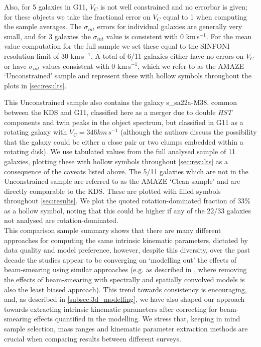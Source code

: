 \documentclass[fleqn,usenatbib]{mnras}
\begin{document}
Also, for 5 galaxies in G11, $V_{C}$ is not well constrained and no errorbar is given; for these objects we take the fractional error on $V_{C}$ equal to 1 when computing the sample averages.
The $\sigma_{int}$ errors for individual galaxies are generally very small, and for 3 galaxies the $\sigma_{int}$ value is consistent with 0 km\,s$^{-1}$.
For the mean value computation for the full sample we set these equal to the SINFONI resolution limit of 30 km\,s$^{-1}$.
A total of 6/11 galaxies either have no errors on $V_{C}$ or have $\sigma_{int}$ values consistent with 0 km\,s$^{-1}$, which we refer to as the AMAZE `Unconstrained' sample and represent these with hollow symbols throughout the plots in \cref{sec:results}.


This Unconstrained sample also contains the galaxy s\_sa22a-M38, common between the KDS and G11, classified here as a merger due to double {\em HST} components and twin peaks in the object spectrum, but classified in G11 as a rotating galaxy with $V_{C} = 346 km\,s^{-1}$ (although the authors discuss the possibility that the galaxy could be either a close pair or two clumps embedded within a rotating disk).
We use tabulated values from the full analysed sample of 11 galaxies, plotting these with hollow symbols throughout \cref{sec:results} as a consequence of the caveats listed above.
The 5/11 galaxies which are not in the Unconstrained sample are referred to as the AMAZE `Clean sample' and are directly comparable to the KDS.
These are plotted with filled symbols throughout \cref{sec:results}.
We plot the quoted rotation-dominated fraction of 33$\%$ as a hollow symbol, noting that this could be higher if any of the 22/33 galaxies not analysed are rotation-dominated. \\


This comparison sample summary shows that there are many different approaches for computing the same intrinsic kinematic parameters, dictated by data quality and model preference, however, despite this diversity, over the past decade the studies appear to be converging on `modelling out' the effects of beam-smearing using similar approaches (e.g. as described in \citealt{Davies2011}, where removing the effects of beam-smearing with spectrally and spatially convolved models is also the least biased approach).
This trend towards consistency is encouraging, and, as described in \cref{subsec:3d_modelling}, we have also shaped our approach towards extracting intrinsic kinematic parameters after correcting for beam-smearing effects quantified in the modelling.
We stress that, keeping in mind sample selection, mass ranges and kinematic parameter extraction methods are crucial when comparing results between different surveys.
\end{document}
